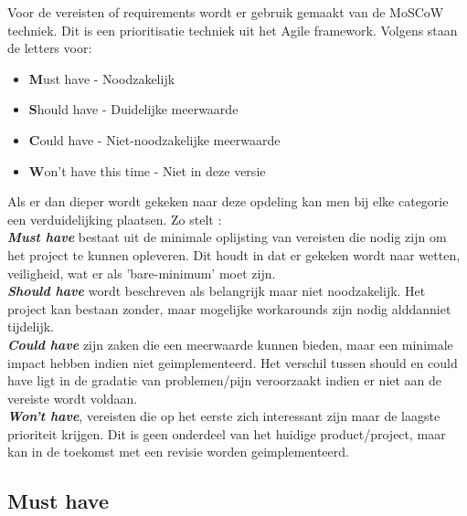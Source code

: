 %
Voor de vereisten of requirements wordt er gebruik gemaakt van de MoSCoW techniek. Dit is een prioritisatie techniek uit het Agile framework. Volgens \textcite{2025agile} staan de letters voor:

\begin{itemize}
  \item \textbf{M}ust have - Noodzakelijk
  \item \textbf{S}hould have - Duidelijke meerwaarde
  \item \textbf{C}ould have - Niet-noodzakelijke meerwaarde
  \item \textbf{W}on't have this time - Niet in deze versie
\end{itemize}

Als er dan dieper wordt gekeken naar deze opdeling kan men bij elke categorie een verduidelijking plaatsen. Zo stelt \textcite{2025agile}:\\

\textbf{\textit{Must have}} bestaat uit de minimale oplijsting van vereisten die nodig zijn om het project te kunnen opleveren. Dit houdt in dat er gekeken wordt naar wetten, veiligheid, wat er als 'bare-minimum' moet zijn.\\

\textbf{\textit{Should have}} wordt beschreven als belangrijk maar niet noodzakelijk. Het project kan bestaan zonder, maar mogelijke workarounds zijn nodig alddanniet tijdelijk.\\

\textbf{\textit{Could have}} zijn zaken die een meerwaarde kunnen bieden, maar een minimale impact hebben indien niet geimplementeerd. Het verschil tussen should en could have ligt in de gradatie van problemen/pijn veroorzaakt indien er niet aan de vereiste wordt voldaan.\\

\textbf{\textit{Won't have}}, vereisten die op het eerste zich interessant zijn maar de laagste prioriteit krijgen. Dit is geen onderdeel van het huidige product/project, maar kan in de toekomst met een revisie worden geimplementeerd.\\

\subsection{Must have}
\label{sec:Must-have}

